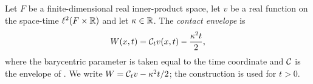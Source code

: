 \begin{definition}
Let $F$ be a finite-dimensional real inner-product space, let $v$ be a real
function on the space-time $\ell^2(F\times\mathbb{R})$ and let $\kappa\in\mathbb{R}$. The
\emph{contact envelope} is
\[
  W(x,t)=\mathcal{C}_t v(x,t)-\frac{\kappa^2t}{2},
\]
where the barycentric parameter is taken equal to the time coordinate and
$\mathcal{C}$ is the envelope of . We write
$W=\mathcal{C}_tv-\kappa^2t/2$; the construction is used for $t>0$.
\end{definition}
